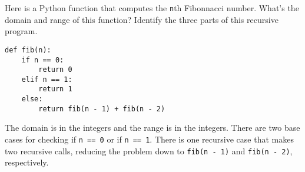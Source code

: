 \begin{blocksection}
\question Here is a Python function that computes the \lstinline$n$th Fibonnacci number. What's the domain and range of this function? Identify the three parts of this recursive program.

\begin{lstlisting}
def fib(n):
    if n == 0:
        return 0
    elif n == 1:
        return 1
    else:
        return fib(n - 1) + fib(n - 2)
\end{lstlisting}

\begin{solution}[0.5in]
The domain is in the integers and the range is in the integers. There are two
base cases for checking if \lstinline$n == 0$ or if \lstinline$n == 1$. There
is one recursive case that makes two recursive calls, reducing the problem down
to \lstinline$fib(n - 1)$ and \lstinline$fib(n - 2)$, respectively.
\end{solution}
\end{blocksection}
